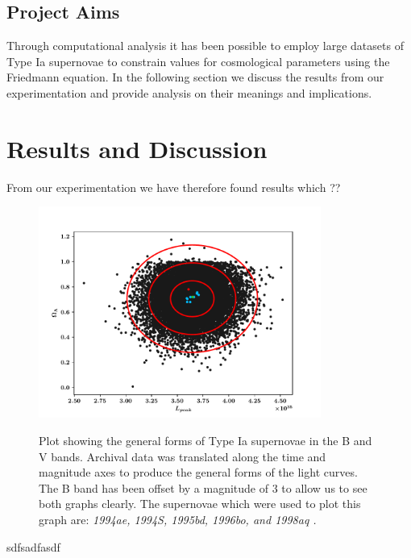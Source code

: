 \documentclass[twocolumn]{revtex4}
\begin{document}
\vspace{-3ex}
\subsection{Project Aims}
\vspace{-2ex}
Through computational analysis it has been possible to employ large datasets of Type Ia supernovae to constrain values for cosmological parameters using the Friedmann equation. In the following section we discuss the results from our experimentation and provide analysis on their meanings and implications.

\vspace{-3ex}
\section{Results and Discussion} 
\label{sec:results_discussion}
\vspace{-2ex}
From our experimentation we have therefore found results which ??

\begin{figure}[!h]
\begin{center}
\includegraphics[width=9.25cm]{results/ol_lp_complete}
\caption[]{Plot showing the general forms of Type Ia supernovae in the B and V bands. Archival data was translated along the time and magnitude axes to produce the general forms of the light curves. The B band has been offset by a magnitude of $3$ to allow us to see both graphs clearly. The supernovae which were used to plot this graph are: \em{1994ae, 1994S, 1995bd, 1996bo, }\em  and \em{1998aq }\em \cite{jha, matheson}. }
\vspace{-3ex}
\label{fig:ol_lp_complete}
\end{center}
\end{figure}

sdfsadfasdf
\end{document}
